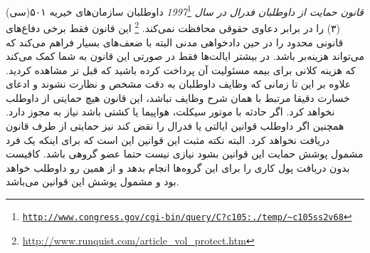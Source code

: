 \begin{itemize}
\emph{قانون حمایت از داوطلبان فدرال در سال 1997}\footnote{\texttt{\url{http://www.congress.gov/cgi-bin/query/C?c105:./temp/~c105ss2v68}}}
داوطلبان سازمان‌های خیریه ۵۰۱(سی)(۳) را در برابر دعاوی حقوقی محافظت نمی‌کند.
\footnote{\url{http://www.runquist.com/article_vol_protect.htm}}
این قانون فقط برخی دفاع‌های قانونی محدود را در حین دادخواهی مدنی البته با ضعف‌های بسیار
فراهم می‌کند که می‌تواند هزینه‌بر باشد. در بیشتر ایالت‌ها فقط در صورتی این قانون به شما کمک می‌کند
که هزینه کلانی برای بیمه مسئولیت آن پرداخت کرده باشید که قبل تر مشاهده کردید. 
علاوه بر این تا زمانی که وظایف داوطلبان به دقت مشخص و نظارت نشوند و ادعای خسارت دقیقا مرتبط
با همان شرح وظایف نباشد، این قانون هیچ حمایتی از داوطلب نخواهد کرد.  اگر حادثه با موتور سیکلت،
هواپیما یا کشتی باشد نیاز به مجوز دارد. همچنین اگر داوطلب قوانین ایالتی یا فدرال را نقض کند نیز
حمایتی از طرف قانون دریافت نخواهد کرد.
البته نکته مثبت این قوانین این است که برای اینکه یک فرد مشمول پوشش حمایت این قوانین بشود
نیازی نیست حتما عضو گروهی باشد. کافیست بدون دریافت پول کاری را برای این گروه‌ها انجام بدهد
و از همین رو داوطلب خواهد بود و مشمول پوشش این قوانین می‌باشد.
\end{itemize}

